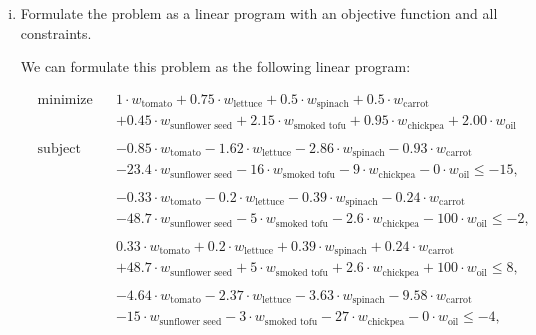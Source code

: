 \documentclass[../main.tex]{subfiles}
\begin{document}
\begin{enumerate}[i.]
	\item Formulate the problem as a linear program with an objective function and all constraints.

	We can formulate this problem as the following linear program:

	\begin{equation*}
		\begin{aligned}
			& \text{minimize} & & 1 \cdot w_{\text{tomato}} + 0.75 \cdot  w_{\text{lettuce}} + 0.5 \cdot w_{\text{spinach}} + 0.5 \cdot w_{\text{carrot}} \\
			& & & + 0.45 \cdot w_{\text{sunflower seed}} + 2.15 \cdot w_{\text{smoked tofu}} + 0.95 \cdot w_{\text{chickpea}} + 2.00 \cdot w_{\text{oil}}\\ \\
			& \text{subject to} & & -0.85 \cdot w_{\text{tomato}} - 1.62 \cdot  w_{\text{lettuce}} - 2.86 \cdot w_{\text{spinach}} - 0.93 \cdot w_{\text{carrot}} \\
			& & & - 23.4 \cdot w_{\text{sunflower seed}} - 16 \cdot w_{\text{smoked tofu}} - 9 \cdot w_{\text{chickpea}} - 0 \cdot w_{\text{oil}} \leq -15, \\ \\
			& & & - 0.33 \cdot w_{\text{tomato}} - 0.2 \cdot  w_{\text{lettuce}} - 0.39 \cdot w_{\text{spinach}} - 0.24  \cdot w_{\text{carrot}} \\
			& & & - 48.7 \cdot w_{\text{sunflower seed}} - 5 \cdot w_{\text{smoked tofu}} - 2.6 \cdot w_{\text{chickpea}} - 100 \cdot w_{\text{oil}} \leq -2, \\ \\
			& & & 0.33 \cdot w_{\text{tomato}} + 0.2 \cdot  w_{\text{lettuce}} + 0.39 \cdot w_{\text{spinach}} + 0.24  \cdot w_{\text{carrot}} \\
			& & & + 48.7 \cdot w_{\text{sunflower seed}} + 5 \cdot w_{\text{smoked tofu}} + 2.6 \cdot w_{\text{chickpea}} + 100 \cdot w_{\text{oil}} \leq 8, \\ \\
			& & & - 4.64 \cdot w_{\text{tomato}} - 2.37 \cdot  w_{\text{lettuce}} - 3.63 \cdot w_{\text{spinach}} - 9.58  \cdot w_{\text{carrot}} \\
			& & & - 15 \cdot w_{\text{sunflower seed}} - 3 \cdot w_{\text{smoked tofu}} - 27 \cdot w_{\text{chickpea}} - 0 \cdot w_{\text{oil}} \leq -4, \\ \\

\end{aligned}
\end{equation*}
\end{enumerate}
\end{document}
